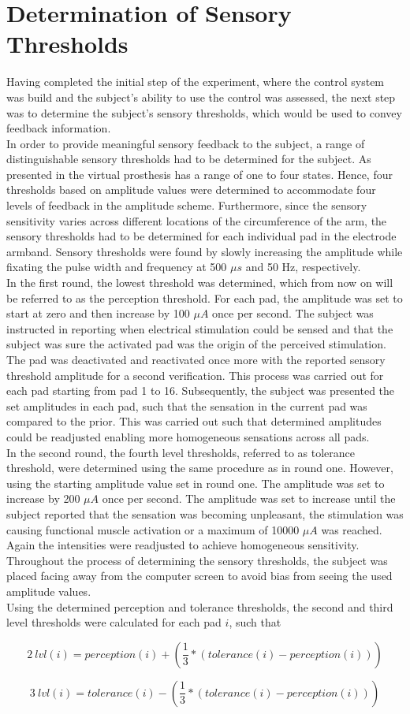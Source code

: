 
\section{Determination of Sensory Thresholds}

Having completed the initial step of the experiment, where the control system was build and the subject's ability to use the control was assessed, the next step was to determine the subject's sensory thresholds, which would be used to convey feedback information. \\
In order to provide meaningful sensory feedback to the subject, a range of distinguishable sensory thresholds had to be determined for the subject. As presented in  the virtual prosthesis has a range of one to four states. Hence, four thresholds based on amplitude values were determined to accommodate four levels of feedback in the amplitude scheme. Furthermore, since the sensory sensitivity varies across different locations of the circumference of the arm, the sensory thresholds had to be determined for each individual pad in the electrode armband. Sensory thresholds were found by slowly increasing the amplitude while fixating the pulse width and frequency at 500 $\mu s $ and 50 Hz, respectively. \\
In the first round, the lowest threshold was determined, which from now on will be referred to as the perception threshold. For each pad, the amplitude was set to start at zero and then increase by 100 $\mu A $ once per second. The subject was instructed in reporting when electrical stimulation could be sensed and that the subject was sure the activated pad was the origin of the perceived stimulation. The pad was deactivated and reactivated once more with the reported sensory threshold amplitude for a second verification. This process was carried out for each pad starting from pad 1 to 16. Subsequently, the subject was presented the set amplitudes in each pad, such that the sensation in the current pad was compared to the prior. This was carried out such that determined amplitudes could be readjusted enabling more homogeneous sensations across all pads.  \\
In the second round, the fourth level thresholds, referred to as tolerance threshold, were determined using the same procedure as in round one. However, using the starting amplitude value set in round one. The amplitude was set to increase by 200 $\mu A $ once per second. The amplitude was set to increase until the subject reported that the sensation was becoming unpleasant, the stimulation was causing functional muscle activation or a maximum of 10000 $\mu A $ was reached. Again the intensities were readjusted to achieve homogeneous sensitivity. Throughout the process of determining the sensory thresholds, the subject was placed facing away from the computer screen to avoid bias from seeing the used amplitude values.  \\ 
Using the determined perception and tolerance thresholds, the second and third level thresholds were calculated for each pad $i$, such that

\begin{equation}
2~lvl(i) = perception(i) + (\frac{1}{3} * (tolerance(i) - perception(i)))
\end{equation}

\begin{equation}
3~lvl(i) = tolerance(i) - (\frac{1}{3} * (tolerance(i) - perception(i)))
\end{equation}


       